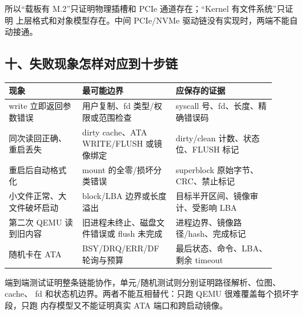 所以“载板有 M.2”只证明物理插槽和 PCIe 通道存在；“Kernel 有文件系统”只证明
上层格式和对象模型存在。中间 PCIe/NVMe 驱动链没有实现时，两端不能自动接通。

\subsection{十、失败现象怎样对应到十步链}

\begin{longtable}{L{0.25\linewidth}L{0.31\linewidth}L{0.34\linewidth}}
\toprule
现象 & 最可能边界 & 应保存的证据 \\
\midrule
write 立即返回参数错误 & 用户复制、fd 类型/权限或范围检查 & syscall 号、fd、长度、精确错误码 \\
同次读回正确、重启丢失 & dirty cache、ATA WRITE/FLUSH 或镜像绑定 & dirty/clean 计数、状态位、FLUSH 标记 \\
重启后自动格式化 & mount 的全零/损坏分类错误 & superblock 原始字节、CRC、禁止标记 \\
小文件正常、大文件破坏启动 & block/LBA 边界或长度溢出 & 目标半开区间、镜像审计、受影响 LBA \\
第二次 QEMU 读到旧内容 & 旧进程未终止、磁盘文件错误或 flush 未完成 & 进程边界、镜像路径/hash、完成标记 \\
随机卡在 ATA & BSY/DRQ/ERR/DF 轮询与预算 & 最后状态、命令、LBA、剩余 timeout \\
\bottomrule
\end{longtable}

端到端测试证明整条链能协作，单元/随机测试则分别证明路径解析、位图、cache、
fd 和状态机边界。两者不能互相替代：只跑 QEMU 很难覆盖每个损坏字段，只跑
内存模型又不能证明真实 ATA 端口和跨启动镜像。
